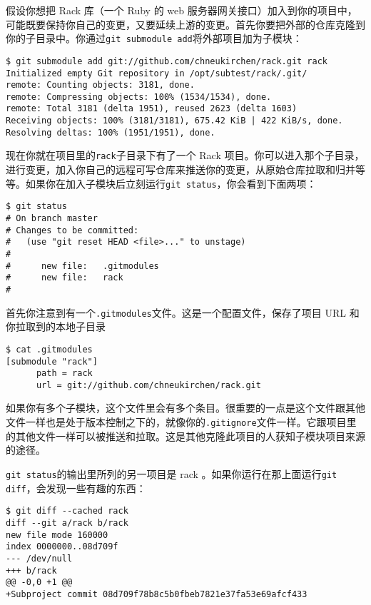 \documentclass[a4paper]{book}
\begin{document}
假设你想把 Rack 库（一个 Ruby 的 web 服务器网关接口）加入到你的项目中，可能既要保持你自己的变更，又要延续上游的变更。首先你要把外部的仓库克隆到你的子目录中。你通过\texttt{git submodule add}将外部项目加为子模块：

\begin{shaded}\begin{verbatim}
$ git submodule add git://github.com/chneukirchen/rack.git rack
Initialized empty Git repository in /opt/subtest/rack/.git/
remote: Counting objects: 3181, done.
remote: Compressing objects: 100% (1534/1534), done.
remote: Total 3181 (delta 1951), reused 2623 (delta 1603)
Receiving objects: 100% (3181/3181), 675.42 KiB | 422 KiB/s, done.
Resolving deltas: 100% (1951/1951), done.
\end{verbatim}\end{shaded}

现在你就在项目里的\texttt{rack}子目录下有了一个 Rack 项目。你可以进入那个子目录，进行变更，加入你自己的远程可写仓库来推送你的变更，从原始仓库拉取和归并等等。如果你在加入子模块后立刻运行\texttt{git status}，你会看到下面两项：

\begin{shaded}\begin{verbatim}
$ git status
# On branch master
# Changes to be committed:
#   (use "git reset HEAD <file>..." to unstage)
#
#      new file:   .gitmodules
#      new file:   rack
#
\end{verbatim}\end{shaded}

首先你注意到有一个\texttt{.gitmodules}文件。这是一个配置文件，保存了项目 URL 和你拉取到的本地子目录

\begin{shaded}\begin{verbatim}
$ cat .gitmodules 
[submodule "rack"]
      path = rack
      url = git://github.com/chneukirchen/rack.git
\end{verbatim}\end{shaded}

如果你有多个子模块，这个文件里会有多个条目。很重要的一点是这个文件跟其他文件一样也是处于版本控制之下的，就像你的\texttt{.gitignore}文件一样。它跟项目里的其他文件一样可以被推送和拉取。这是其他克隆此项目的人获知子模块项目来源的途径。

\texttt{git status}的输出里所列的另一项目是 rack 。如果你运行在那上面运行\texttt{git diff}，会发现一些有趣的东西：

\begin{shaded}\begin{verbatim}
$ git diff --cached rack
diff --git a/rack b/rack
new file mode 160000
index 0000000..08d709f
--- /dev/null
+++ b/rack
@@ -0,0 +1 @@
+Subproject commit 08d709f78b8c5b0fbeb7821e37fa53e69afcf433
\end{verbatim}\end{shaded}
\end{document}
